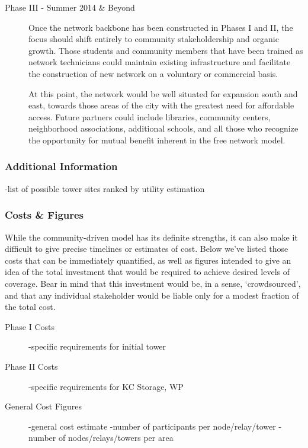 \begin{description}
\item[Phase III - Summer 2014 \& Beyond]
Once the network backbone has been constructed in Phases I and II, the
focus should shift entirely to community stakeholdership and organic growth.
Those students and community members that have been trained as network
technicians could maintain existing infrastructure and facilitate the
construction of new network on a voluntary or commercial basis. \par
At this point, the network would be well situated for expansion south and east,
towards those areas of the city with the greatest need for affordable access.
Future partners could include libraries, community centers, neighborhood
associations, additional schools, and all those who recognize the opportunity
for mutual benefit inherent in the free network model.\par
\end{description}

\subsubsection{Additional Information}
-list of possible tower sites ranked by utility estimation

\subsubsection{Costs \& Figures}
While the community-driven model has its definite strengths, it can also make it
difficult to give precise timelines or estimates of cost. Below we've listed
those costs that can be immediately quantified, as well as figures intended to
give an idea of the total investment that would be required to achieve desired
levels of coverage. Bear in mind that this investment would be, in a sense,
`crowdsourced', and that any individual stakeholder would be liable only for a
modest fraction of the total cost. \par

\begin{description}
\item[Phase I Costs]
-specific requirements for initial tower
\item[Phase II Costs]
-specific requirements for KC Storage, WP
\item[General Cost Figures]
-general cost estimate
-number of participants per node/relay/tower
-number of nodes/relays/towers per area
\end{description}


